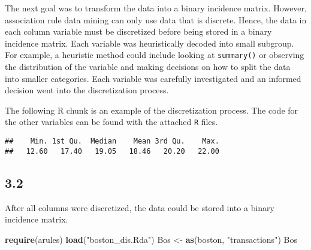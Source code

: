 \documentclass[]{article}
\newenvironment{Shaded}{\begin{snugshade}}{\end{snugshade}}
\newcommand{\KeywordTok}[1]{\textcolor[rgb]{0.13,0.29,0.53}{\textbf{{#1}}}}
\newcommand{\DataTypeTok}[1]{\textcolor[rgb]{0.13,0.29,0.53}{{#1}}}
\newcommand{\DecValTok}[1]{\textcolor[rgb]{0.00,0.00,0.81}{{#1}}}
\newcommand{\FloatTok}[1]{\textcolor[rgb]{0.00,0.00,0.81}{{#1}}}
\newcommand{\StringTok}[1]{\textcolor[rgb]{0.31,0.60,0.02}{{#1}}}
\newcommand{\CommentTok}[1]{\textcolor[rgb]{0.56,0.35,0.01}{\textit{{#1}}}}
\newcommand{\NormalTok}[1]{{#1}}
\begin{document}
The next goal was to transform the data into a binary incidence matrix.
However, association rule data mining can only use data that is
discrete. Hence, the data in each column variable must be discretized
before being stored in a binary incidence matrix. Each variable was
heuristically decoded into small subgroup. For example, a heuristic
method could include looking at \texttt{summary()} or observing the
distribution of the variable and making decisions on how to split the
data into smaller categories. Each variable was carefully investigated
and an informed decision went into the discretization process.

The following R chunk is an example of the discretization process. The
code for the other variables can be found with the attached \texttt{R}
files.

\begin{Shaded}
\end{Shaded}

\begin{verbatim}
##    Min. 1st Qu.  Median    Mean 3rd Qu.    Max. 
##   12.60   17.40   19.05   18.46   20.20   22.00
\end{verbatim}

\begin{Shaded}
\end{Shaded}

\subsection{3.2}\label{section-4}

After all columns were discretized, the data could be stored into a
binary incidence matrix.

\begin{Shaded}
\begin{Highlighting}[]
\KeywordTok{require}\NormalTok{(arules)}
\KeywordTok{load}\NormalTok{(}\StringTok{"boston_dis.Rda"}\NormalTok{)}
\NormalTok{Bos <-}\StringTok{ }\KeywordTok{as}\NormalTok{(boston, }\StringTok{"transactions"}\NormalTok{)}
\NormalTok{Bos}
\end{Highlighting}
\end{Shaded}
\end{document}
